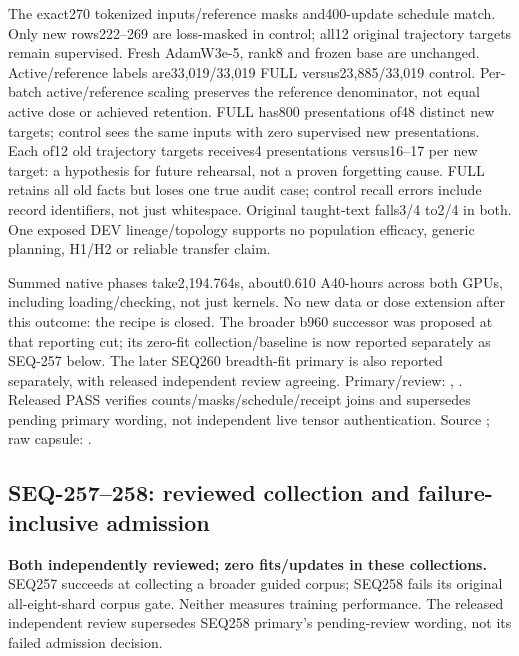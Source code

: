 \documentclass[11pt]{article}
\begin{document}
The exact270 tokenized inputs/reference masks and400-update schedule match.
Only new rows222--269 are loss-masked in control; all12 original trajectory
targets remain supervised. Fresh AdamW3e-5, rank8 and frozen base are unchanged.
Active/reference labels are33,019/33,019 FULL versus23,885/33,019 control.
Per-batch active/reference scaling preserves the reference denominator, not
equal active dose or achieved retention. FULL has800 presentations of48 distinct new targets;
control sees the same inputs with zero supervised new presentations. Each of12
old trajectory targets receives4 presentations versus16--17 per new target:
a hypothesis for future rehearsal, not a proven forgetting cause. FULL retains
all old facts but loses one true audit case; control recall errors include record
identifiers, not just whitespace. Original taught-text falls3/4 to2/4 in both.
One exposed DEV lineage/topology supports no population efficacy, generic
planning, H1/H2 or reliable transfer claim.

Summed native phases take2,194.764s, about0.610 A40-hours across both GPUs,
including loading/checking, not just kernels. No new data or dose extension
after this outcome: the recipe is closed. The broader b960 successor was
proposed at that reporting cut; its zero-fit collection/baseline is now reported
separately as SEQ-257 below. The later SEQ260 breadth-fit primary is also
reported separately, with released independent review agreeing. Primary/review:
,
.
Released PASS verifies counts/masks/schedule/receipt joins and supersedes pending
primary wording, not independent live tensor authentication. Source
; raw capsule:
.

\subsection{SEQ-257--258: reviewed collection and failure-inclusive admission}
\label{sec:breadth-scale-collection}

\textbf{Both independently reviewed; zero fits/updates in these collections.}
SEQ257 succeeds at collecting a broader guided corpus; SEQ258 fails its original
all-eight-shard corpus gate. Neither measures training performance. The released
independent review supersedes SEQ258 primary's pending-review wording, not its
failed admission decision.
\end{document}
